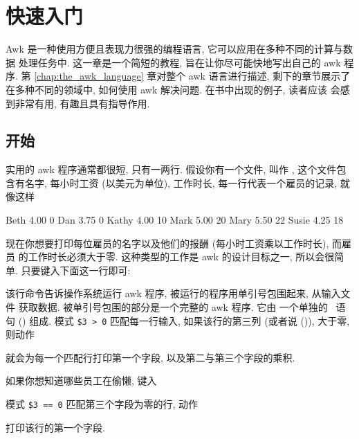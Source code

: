 
\chapter{快速入门}
\label{chap:an_awk_tutorial}

Awk 是一种使用方便且表现力很强的编程语言, 它可以应用在多种不同的计算与数据
处理任务中. 这一章是一个简短的教程, 旨在让你尽可能快地写出自己的 awk 程序.
第 \ref{chap:the_awk_language} 章对整个 awk 语言进行描述, 剩下的章节展示了
在多种不同的领域中, 如何使用 awk 解决问题. 在书中出现的例子, 读者应该
会感到非常有用, 有趣且具有指导作用.

\section{开始}
\label{sec:getting_started}

实用的 awk 程序通常都很短, 只有一两行. 假设你有一个文件, 叫作
, 这个文件包含有名字, 每小时工资 (以美元为单位),
工作时长, 每一行代表一个雇员的记录, 就像这样
\begin{myverb}
    Beth    4.00    0
    Dan     3.75    0
    Kathy   4.00    10
    Mark    5.00    20
    Mary    5.50    22
    Susie   4.25    18
\end{myverb}
现在你想要打印每位雇员的名字以及他们的报酬 (每小时工资乘以工作时长), 而雇员
的工作时长必须大于零. 这种类型的工作是 awk 的设计目标之一, 所以会很简单.
只要键入下面这一行即可:
该行命令告诉操作系统运行 awk 程序, 被运行的程序用单引号包围起来, 从输入文件
 获取数据. 被单引号包围的部分是一个完整的 awk 程序. 它由
一个单独的 \ 语句
() 组成.
模式 \verb'$3 > 0' 匹配每一行输入, 如果该行的第三列 (或者说 
()), 大于零, 则动作
就会为每一个匹配行打印第一个字段, 以及第二与第三个字段的乘积.

如果你想知道哪些员工在偷懒, 键入
模式 \verb'$3 == 0' 匹配第三个字段为零的行, 动作
打印该行的第一个字段.

